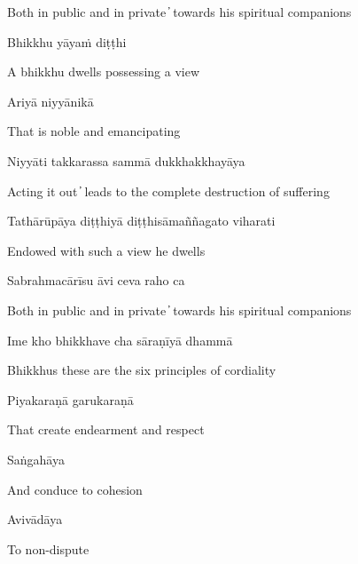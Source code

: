 \begin{cprenglish}
  Both in public and in private  ̓  towards his spiritual companions
\end{cprenglish}

Bhikkhu yāyaṁ diṭṭhi

\begin{cprenglish}
  A bhikkhu dwells possessing a view
\end{cprenglish}

Ariyā niyyānikā

\begin{cprenglish}
  That is noble and emancipating
\end{cprenglish}

Niyyāti takkarassa sammā dukkhakkhayāya

\begin{cprenglish}
  Acting it out  ̓  leads to the complete destruction of suffering
\end{cprenglish}

Tathārūpāya diṭṭhiyā diṭṭhisāmaññagato viharati

\begin{cprenglish}
  Endowed with such a view he dwells
\end{cprenglish}

Sabrahmacārīsu āvi ceva raho ca

\begin{cprenglish}
  Both in public and in private  ̓  towards his spiritual companions
\end{cprenglish}

Ime kho bhikkhave cha sāraṇīyā dhammā

\begin{cprenglish}
  Bhikkhus these are the six principles of cordiality
\end{cprenglish}

Piyakaraṇā garukaraṇā

\begin{cprenglish}
  That create endearment and respect
\end{cprenglish}

Saṅgahāya

\begin{cprenglish}
  And conduce to cohesion
\end{cprenglish}

Avivādāya

\begin{cprenglish}
  To non-dispute
\end{cprenglish}

